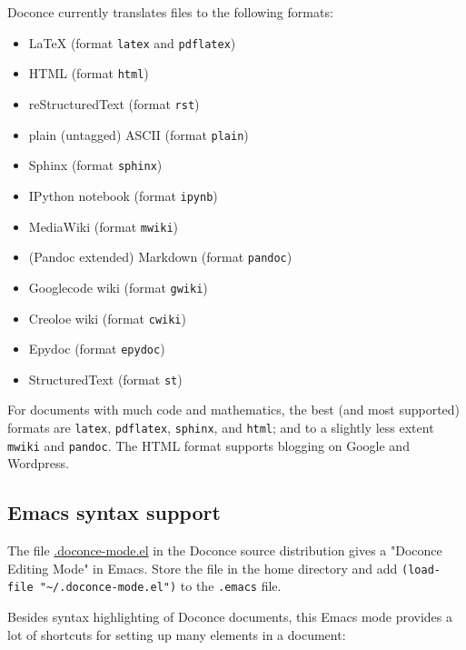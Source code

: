 \documentclass[%
oneside,                 %
final,                   %
10pt]{article}
\begin{document}
Doconce currently translates files to the following formats:

\begin{itemize}
 \item {\LaTeX} (format \Verb!latex! and \Verb!pdflatex!)

 \item HTML (format \Verb!html!)

 \item reStructuredText (format \Verb!rst!)

 \item plain (untagged) ASCII (format \Verb!plain!)

 \item Sphinx (format \Verb!sphinx!)

 \item IPython notebook (format \Verb!ipynb!)

 \item MediaWiki (format \Verb!mwiki!)

 \item (Pandoc extended) Markdown (format \Verb!pandoc!)

 \item Googlecode wiki (format \Verb!gwiki!)

 \item Creoloe wiki (format \Verb!cwiki!)

 \item Epydoc (format \Verb!epydoc!)

 \item StructuredText (format \Verb!st!)
\end{itemize}

\noindent
For documents with much code and mathematics, the best (and most supported)
formats are \Verb!latex!, \Verb!pdflatex!, \Verb!sphinx!, and \Verb!html!; and to a slightly
less extent \Verb!mwiki! and \Verb!pandoc!. The HTML format supports blogging on
Google and Wordpress.


\subsection{Emacs syntax support}

The file \href{{https://doconce.googlecode.com/hg/misc/.doconce-mode.el}}{.doconce-mode.el} in the Doconce source distribution
gives a "Doconce Editing Mode" in Emacs. Store the file in the home
directory and add \Verb!(load-file "~/.doconce-mode.el")! to the \Verb!.emacs!
file.

Besides syntax highlighting of Doconce documents, this Emacs mode
provides a lot of shortcuts for setting up many elements in a document:
\end{document}
